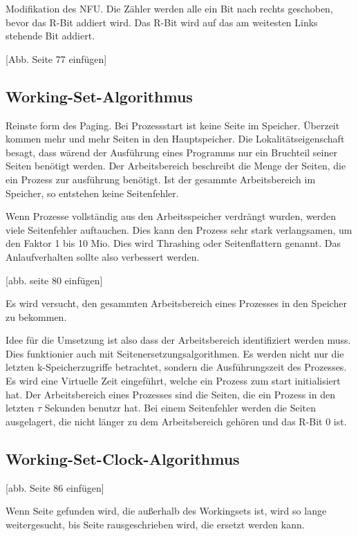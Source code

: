 Modifikation des NFU. Die Zähler werden alle ein Bit nach rechts geschoben, bevor das R-Bit addiert wird. Das R-Bit wird auf das am weitesten Links stehende Bit addiert.

[Abb. Seite 77 einfügen]

\subsection{Working-Set-Algorithmus}

Reinste form des Paging. Bei Prozessstart ist keine Seite im Speicher. Überzeit kommen mehr und mehr Seiten in den Hauptspeicher. Die Lokalitätseigenschaft besagt, dass wärend der Ausführung eines Programms nur ein Bruchteil seiner Seiten benötigt werden. Der Arbeitsbereich beschreibt die Menge der Seiten, die ein Prozess zur ausführung benötigt. Ist der gesammte Arbeitsbereich im Speicher, so entstehen keine Seitenfehler.

Wenn Prozesse vollständig aus den Arbeitsspeicher verdrängt wurden, werden viele Seitenfehler auftauchen. Dies kann den Prozess sehr stark verlangsamen, um den Faktor 1 bis 10 Mio. Dies wird Thrashing oder Seitenflattern genannt. Das Anlaufverhalten sollte also verbessert werden.

[abb. seite 80 einfügen]

Es wird versucht, den gesammten Arbeitsbereich eines Prozesses in den Speicher zu bekommen. 

Idee für die Umsetzung ist also dass der Arbeitsbereich identifiziert werden muss. Dies funktionier auch mit Seitenersetzungsalgorithmen. Es werden nicht nur die letzten k-Speicherzugriffe betrachtet, sondern die Ausführungszeit des Prozesses. Es wird eine Virtuelle Zeit eingeführt, welche ein Prozess zum start initialisiert hat. Der Arbeitsbereich eines Prozesses sind die Seiten, die ein Prozess in den letzten $\tau$ Sekunden benutzr hat. Bei einem Seitenfehler werden die Seiten ausgelagert, die nicht länger zu dem Arbeitsbereich gehören und das R-Bit 0 ist. 

\subsection{Working-Set-Clock-Algorithmus}

[abb. Seite 86 einfügen]

Wenn Seite gefunden wird, die außerhalb des Workingsets ist, wird so lange weitergesucht, bis Seite rausgeschrieben wird, die ersetzt werden kann.


